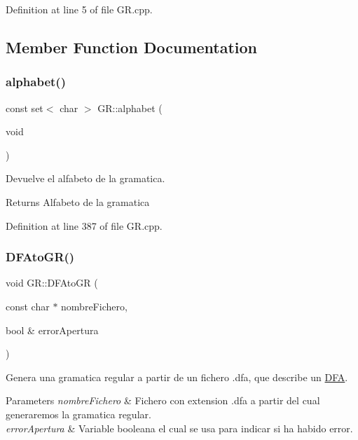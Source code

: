 Definition at line 5 of file G\+R.\+cpp.



\subsection{Member Function Documentation}
\mbox{\label{class_g_r_a316145725ac4ad4acbf7fe9a3f4740bb}} 
\subsubsection{\texorpdfstring{alphabet()}{alphabet()}}
{\footnotesize\ttfamily const set$<$ char $>$ G\+R\+::alphabet (\begin{DoxyParamCaption}\item[{void}]{ }\end{DoxyParamCaption})}



Devuelve el alfabeto de la gramatica. 

\begin{DoxyReturn}{Returns}
Alfabeto de la gramatica 
\end{DoxyReturn}


Definition at line 387 of file G\+R.\+cpp.

\mbox{\label{class_g_r_adc0dab5f68cf05b04053e9628b470746}} 
\subsubsection{\texorpdfstring{D\+F\+Ato\+G\+R()}{DFAtoGR()}}
{\footnotesize\ttfamily void G\+R\+::\+D\+F\+Ato\+GR (\begin{DoxyParamCaption}\item[{const char $\ast$}]{nombre\+Fichero,  }\item[{bool \&}]{error\+Apertura }\end{DoxyParamCaption})}



Genera una gramatica regular a partir de un fichero .dfa, que describe un \hyperlink{class_d_f_a}{D\+FA}. 


\begin{DoxyParams}{Parameters}
{\em nombre\+Fichero} & Fichero con extension .dfa a partir del cual generaremos la gramatica regular. \\
\hline
{\em error\+Apertura} & Variable booleana el cual se usa para indicar si ha habido error. \\
\hline
\end{DoxyParams}


